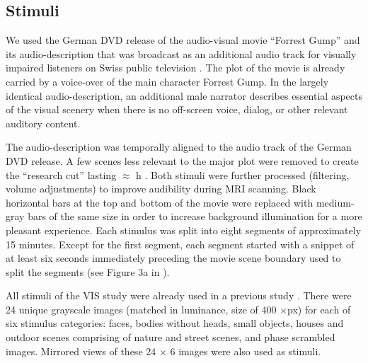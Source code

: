 \documentclass[english]{article}
\begin{document}
\subsection{Stimuli}
We used the German DVD release \citep{ForrestGumpDVD} of the audio-visual movie
``Forrest Gump'' \citep{ForrestGumpMovie} and its audio-description that was
broadcast as an additional audio track for visually impaired listeners on Swiss
public television \citep{ForrestGumpGermanAD}.
The plot of the movie is already carried by a voice-over of the main character
Forrest Gump.
In the largely identical audio-description, an additional male narrator
describes essential aspects of the visual scenery when there is no off-screen
voice, dialog, or other relevant auditory content.

The audio-description was temporally aligned to the audio track of the German
DVD release. A few scenes less relevant to the major plot were removed to create
the ``research cut'' lasting $\approx$ \unit[2]{h} \citep{hanke2014audiomovie,
hanke2016simultaneous}.
Both stimuli were further processed (filtering, volume adjustments) to improve
audibility during MRI scanning. Black horizontal bars at the top and bottom of
the movie were replaced with medium-gray bars of the same size in order to
increase background illumination for a more pleasant experience.
Each stimulus was split into eight segments of approximately 15 minutes. Except
for the first segment, each segment started with a snippet of at least six
seconds immediately preceding the movie scene boundary used to split the
segments (see Figure 3a in \citep{hanke2014audiomovie}).

All stimuli of the VIS study were already used in a previous study
\citep{haxby2011common}. There were 24 unique grayscale images (matched in
luminance, size of 400 $\times$\unit[400]{px}) for each of six stimulus
categories: faces, bodies without heads, small objects, houses and
outdoor scenes comprising of nature and street scenes, and phase scrambled
images. Mirrored views of these 24 $\times$ 6 images were also used as stimuli.
\end{document}
